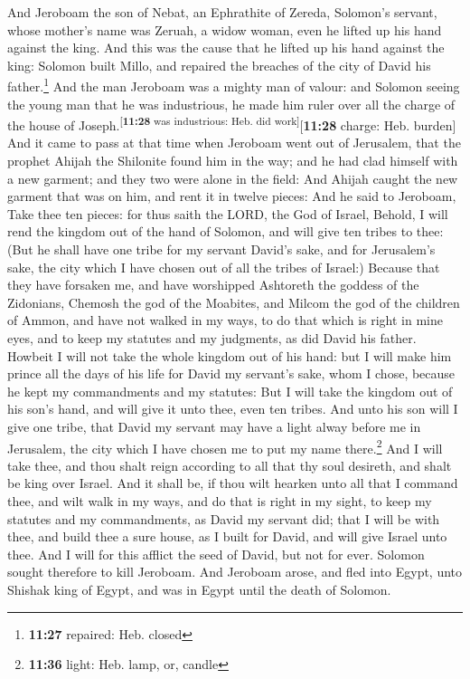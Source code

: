  And Jeroboam the son of Nebat, an Ephrathite of Zereda,
Solomon's servant, whose mother's name was Zeruah, a widow woman, even
he lifted up his hand against the king.  And this was the
cause that he lifted up his hand against the king: Solomon built Millo,
and repaired the breaches of the city of David his father.\footnote{\textbf{11:27}
  repaired: Heb. closed}  And the man Jeroboam was a
mighty man of valour: and Solomon seeing the young man that he was
industrious, he made him ruler over all the charge of the house of
Joseph.\textsuperscript{{[}\textbf{11:28} was industrious: Heb. did
work{]}}{[}\textbf{11:28} charge: Heb. burden{]}  And it
came to pass at that time when Jeroboam went out of Jerusalem, that the
prophet Ahijah the Shilonite found him in the way; and he had clad
himself with a new garment; and they two were alone in the field:
 And Ahijah caught the new garment that was on him, and
rent it in twelve pieces:  And he said to Jeroboam, Take
thee ten pieces: for thus saith the LORD, the God of Israel, Behold, I
will rend the kingdom out of the hand of Solomon, and will give ten
tribes to thee:  (But he shall have one tribe for my
servant David's sake, and for Jerusalem's sake, the city which I have
chosen out of all the tribes of Israel:)  Because that
they have forsaken me, and have worshipped Ashtoreth the goddess of the
Zidonians, Chemosh the god of the Moabites, and Milcom the god of the
children of Ammon, and have not walked in my ways, to do that which is
right in mine eyes, and to keep my statutes and my judgments, as did
David his father.  Howbeit I will not take the whole
kingdom out of his hand: but I will make him prince all the days of his
life for David my servant's sake, whom I chose, because he kept my
commandments and my statutes:  But I will take the
kingdom out of his son's hand, and will give it unto thee, even ten
tribes.  And unto his son will I give one tribe, that
David my servant may have a light alway before me in Jerusalem, the city
which I have chosen me to put my name there.\footnote{\textbf{11:36}
  light: Heb. lamp, or, candle}  And I will take thee,
and thou shalt reign according to all that thy soul desireth, and shalt
be king over Israel.  And it shall be, if thou wilt
hearken unto all that I command thee, and wilt walk in my ways, and do
that is right in my sight, to keep my statutes and my commandments, as
David my servant did; that I will be with thee, and build thee a sure
house, as I built for David, and will give Israel unto thee.
 And I will for this afflict the seed of David, but not
for ever.  Solomon sought therefore to kill Jeroboam. And
Jeroboam arose, and fled into Egypt, unto Shishak king of Egypt, and was
in Egypt until the death of Solomon.

